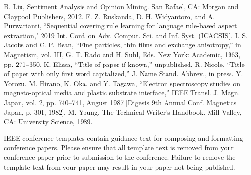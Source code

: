 \documentclass[a4paper,conference]{IEEEtran}
\begin{document}
\begin{thebibliography}{00}
 B. Liu, Sentiment Analysis and Opinion Mining. San Rafael, CA: Morgan and Claypool Publishers, 2012.
 F. Z. Ruskanda, D. H. Widyantoro, and A. Purwarianti, ``Sequential covering rule learning for language rule-based aspect extraction," 2019 Int. Conf. on Adv. Comput. Sci. and Inf. Syst. (ICACSIS).
 I. S. Jacobs and C. P. Bean, ``Fine particles, thin films and exchange anisotropy,'' in Magnetism, vol. III, G. T. Rado and H. Suhl, Eds. New York: Academic, 1963, pp. 271--350.
 K. Elissa, ``Title of paper if known,'' unpublished.
 R. Nicole, ``Title of paper with only first word capitalized,'' J. Name Stand. Abbrev., in press.
 Y. Yorozu, M. Hirano, K. Oka, and Y. Tagawa, ``Electron spectroscopy studies on magneto-optical media and plastic substrate interface,'' IEEE Transl. J. Magn. Japan, vol. 2, pp. 740--741, August 1987 [Digests 9th Annual Conf. Magnetics Japan, p. 301, 1982].
 M. Young, The Technical Writer's Handbook. Mill Valley, CA: University Science, 1989.
\end{thebibliography}
\vspace{12pt}
\color{red}
IEEE conference templates contain guidance text for composing and formatting conference papers. Please ensure that all template text is removed from your conference paper prior to submission to the conference. Failure to remove the template text from your paper may result in your paper not being published.
\end{document}
